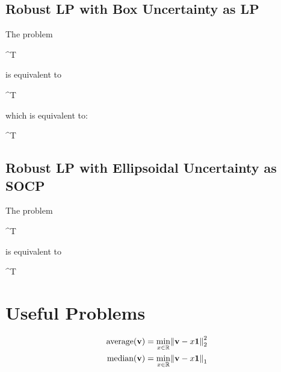 \subsection{Robust LP with Box Uncertainty as LP}

The problem
\begin{mini!}{\vx}{\vc^T \vx}{}{}
\end{mini!}
is equivalent to
\begin{mini!}{\vx}{\vc^T \vx}{}{}
\end{mini!}
which is equivalent to:
\begin{mini!}{\vx}{\vc^T \vx}{}{}
\end{mini!}

\subsection{Robust LP with Ellipsoidal Uncertainty as SOCP}

The problem
\begin{mini!}{\vx}{\vc^T \vx}{}{}
\end{mini!}
is equivalent to
\begin{mini!}{\vx}{\vc^T \vx}{}{}
\end{mini!}

\section{Useful Problems}

\begin{align}
\textrm{average}(\mathbf{v}) &= \min_{x\in\mathbb{R}} \norm{\mathbf{v}-x\mathbf{1}}_2^2 \\
\textrm{median}(\mathbf{v}) &= \min_{x\in\mathbb{R}} \norm{\mathbf{v}-x\mathbf{1}}_1
\end{align}
